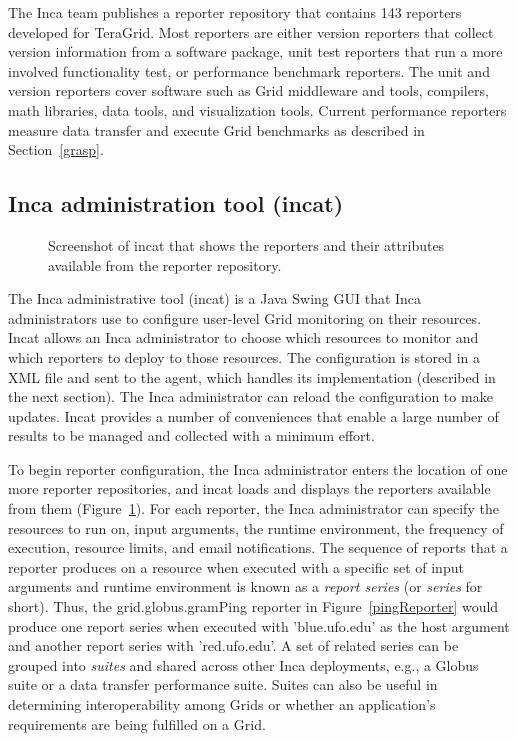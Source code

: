 \documentclass{sig-alternate}
\begin{document}
The Inca team publishes a reporter repository that contains 143 reporters
developed for TeraGrid.  Most reporters are either version
reporters that collect version information from a software package,
unit test reporters that run a more involved
functionality test, or performance benchmark reporters.  The unit and version
reporters cover software such as Grid middleware and tools, compilers, math libraries,
data tools, and visualization tools.  Current performance reporters
measure data transfer and execute Grid benchmarks as described in
Section~\ref{grasp}.

\subsection{Inca administration tool (incat)}

\begin{figure}[tbp]
  \centering
  \mbox{}
  \caption{\label{incat_fig} Screenshot of incat that shows the reporters
  and their attributes available from the reporter repository.}
\end{figure}

The Inca administrative tool (incat) is a Java Swing GUI that
Inca administrators use to configure user-level Grid monitoring on their
resources.  Incat allows an Inca administrator to choose which resources to
monitor and which reporters to deploy to those resources.  The configuration
is stored in a XML file and sent to the agent, which handles its implementation
(described in the next section).  The Inca administrator can reload the
configuration to make updates.  Incat provides a number of
conveniences that enable a large number of results to be managed and collected
with a minimum effort.  

To begin reporter configuration, the Inca administrator enters the location of
one more reporter repositories, and incat loads and displays the reporters
available from them (Figure~\ref{incat_fig}).
For each reporter, the Inca administrator can specify the resources to run on,
input arguments, the runtime environment, the frequency of execution, resource
limits, and email notifications.  The sequence of reports that a reporter
produces on a resource when executed with a specific set of input arguments and
runtime environment is known as a \emph{report series} (or \emph{series} for
short).
Thus, the grid.globus.gramPing reporter in Figure~\ref{pingReporter} would
produce one report series when executed with 'blue.ufo.edu' as the host argument and another report series with 'red.ufo.edu'.  A set of related
series can be grouped into \emph{suites} and shared across other Inca
deployments, e.g.,  a Globus suite or a data transfer
performance suite.  Suites can also be useful in determining interoperability
among Grids or whether an application's requirements are being
fulfilled on a Grid.
\end{document}
